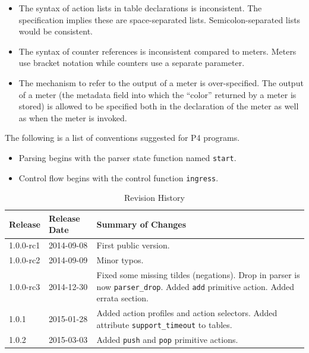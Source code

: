 \documentclass[12pt]{article}
\begin{document}


\begin{itemize}
\item The syntax of action lists in table declarations is inconsistent. The specification implies these are space-separated lists. Semicolon-separated lists would be consistent.
\item The syntax of counter references is inconsistent compared to meters. Meters use bracket notation while counters use a separate parameter.
\item The mechanism to refer to the output of a meter is over-specified. The output of a meter (the metadata field into which the ``color'' returned by a meter is stored) is allowed to be specified both in the declaration of the meter as well as when the meter is invoked.
\end{itemize}



The following is a list of conventions suggested for P4 programs.

\begin{itemize}
\item
Parsing begins with the parser state function named \texttt{start}.
\item
Control flow begins with the control function \texttt{ingress}.
\end{itemize}



\begin{table}[H]
\begin{center}
\begin{tabular}{| l | l | p{} |} \hline
\textbf{Release} &
\textbf{Release Date} &
\textbf{Summary of Changes} \\  \hline
1.0.0-rc1 & 2014-09-08 & First public version. \\  \hline
1.0.0-rc2 & 2014-09-09 & Minor typos. \\  \hline
1.0.0-rc3 & 2014-12-30 & Fixed some missing tildes (negations). Drop in parser is now \texttt{parser_drop}. Added \texttt{add} primitive action. Added errata section. \\  \hline
1.0.1 & 2015-01-28 & Added action profiles and action selectors. Added attribute \texttt{support_timeout} to tables. \\  \hline
1.0.2 & 2015-03-03 & Added \texttt{push} and \texttt{pop} primitive actions. \\  \hline
\end{tabular}
\end{center}
\caption{Revision History}
\label{tab:revhistory}
\end{table}
\end{document}
